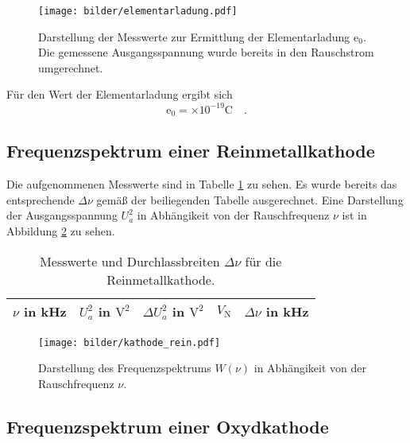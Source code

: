 	\begin{figure}
		\centering
		\texttt{[image: bilder/elementarladung.pdf]}
		\caption{Darstellung der Messwerte zur Ermittlung der
		Elementarladung $\text{e}_0$. Die gemessene Ausgangsspannung
		wurde bereits in den Rauschstrom umgerechnet.}
		\label{fig:elementarladung}
	\end{figure}

	Für den Wert der Elementarladung ergibt sich
	\begin{equation}
	\text{e}_0 =  \times
				10^{-19}\text{C} \quad .
	\end{equation}

\clearpage
\subsection{Frequenzspektrum einer Reinmetallkathode}

	Die aufgenommenen Messwerte sind in Tabelle
	\ref{tab:kathode_rein} zu sehen. Es wurde bereits das
	entsprechende $\Delta \nu$ gemäß der beiliegenden Tabelle
	ausgerechnet. Eine Darstellung der Ausgangsspannung $U_a^2$ in
	Abhängikeit von der Rauschfrequenz $\nu$ ist in Abbildung
	\ref{fig:kathode_rein} zu sehen.
	\begin{table}
		\centering
		\begin{tabular}{ccccc}
		\toprule \midrule
		$\nu$ in kHz & $U_a^2$ in $\text{V}^2$& $\Delta U_a^2$ in
		$\text{V}^2$& $V_\text{N}$ & $\Delta \nu$ in kHz\\
		\midrule
		
		\midrule
		\bottomrule
		\end{tabular}
		\caption{Messwerte und Durchlassbreiten $\Delta \nu$ für
		die Reinmetallkathode.}
		\label{tab:kathode_rein}
	\end{table}

	\begin{figure}
		\centering
		\texttt{[image: bilder/kathode\_rein.pdf]}
		\caption{Darstellung des Frequenzspektrums $W(\nu)$ in
		Abhängikeit von der Rauschfrequenz $\nu$.}
		\label{fig:kathode_rein}
	\end{figure}

\clearpage
\subsection{Frequenzspektrum einer Oxydkathode}

